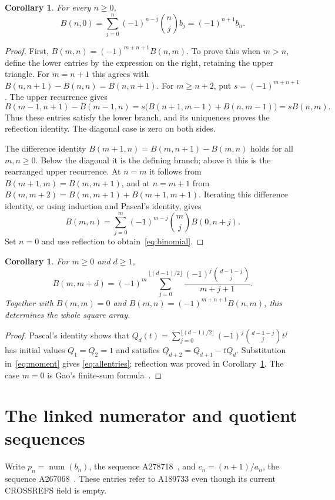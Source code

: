 \documentclass[11pt]{article}
\newtheorem{corollary}[theorem]{Corollary}
\begin{document}
\begin{corollary}\label{cor:binomial}
For every $n\ge0$,
\begin{equation}\label{eq:binomial}
 B(n,0)=\sum_{j=0}^n(-1)^{n-j}\binom nj b_j=(-1)^{n+1}b_n.
\end{equation}
\end{corollary}
\begin{proof}
First, $B(m,n)=(-1)^{m+n+1}B(n,m)$. To prove this when $m>n$,
define the lower entries by the expression on the right, retaining the
upper triangle. For $m=n+1$ this agrees with
$B(n,n+1)-B(n,n)=B(n,n+1)$. For $m\ge n+2$, put
$s=(-1)^{m+n+1}$. The upper recurrence gives
\[
 B(m-1,n+1)-B(m-1,n)
 =s\bigl(B(n+1,m-1)+B(n,m-1)\bigr)=sB(n,m).
\]
Thus these entries satisfy the lower branch, and its uniqueness proves
the reflection identity. The diagonal case is zero on both sides.

The difference identity $B(m+1,n)=B(m,n+1)-B(m,n)$ holds for all
$m,n\ge0$. Below the diagonal it is the defining branch; above it this
is the rearranged upper recurrence. At $n=m$ it follows from
$B(m+1,m)=B(m,m+1)$, and at $n=m+1$ from
$B(m,m+2)=B(m,m+1)+B(m+1,m+1)$. Iterating this difference identity,
or using induction and Pascal's identity, gives
\[
 B(m,n)=\sum_{j=0}^m(-1)^{m-j}\binom mj B(0,n+j).
\]
Set $n=0$ and use reflection to obtain~\eqref{eq:binomial}.
\end{proof}

\begin{corollary}\label{cor:allentries}
For $m\ge0$ and $d\ge1$,
\begin{equation}\label{eq:allentries}
 B(m,m+d)=(-1)^m\sum_{j=0}^{\lfloor(d-1)/2\rfloor}
 \frac{(-1)^j\binom{d-1-j}{j}}{m+j+1}.
\end{equation}
Together with $B(m,m)=0$ and
$B(m,n)=(-1)^{m+n+1}B(n,m)$, this determines the whole square array.
\end{corollary}
\begin{proof}
Pascal's identity shows that
$Q_d(t)=\sum_{j=0}^{\lfloor(d-1)/2\rfloor}(-1)^j\binom{d-1-j}{j}t^j$
has initial values $Q_1=Q_2=1$ and satisfies
$Q_{d+2}=Q_{d+1}-tQ_d$. Substitution in~\eqref{eq:moment} gives
\eqref{eq:allentries}; reflection was proved in Corollary~\ref{cor:binomial}.
The case $m=0$ is Gao's finite-sum formula~\cite{gao}.
\end{proof}

\section{The linked numerator and quotient sequences}
Write $p_n=\operatorname{num}(b_n)$, the sequence A278718~\cite{numerators},
and $c_n=(n+1)/a_n$, the sequence A267068~\cite{quotients}.
These entries refer to A189733 even though its current CROSSREFS field is empty.
\end{document}
